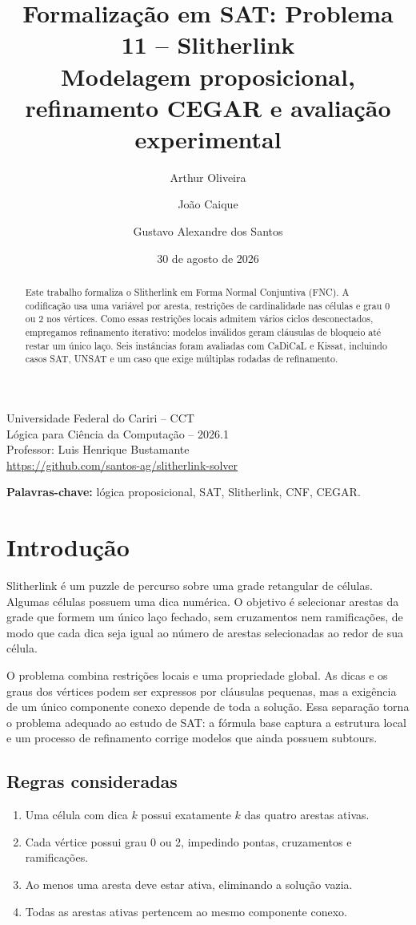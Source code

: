 \documentclass[11pt,a4paper]{article}
\title{\textbf{Formalização em SAT: Problema 11 -- Slitherlink}\\
\large Modelagem proposicional, refinamento CEGAR e avaliação experimental}
\author{Arthur Oliveira \and João Caique \and Gustavo Alexandre dos Santos}
\date{30 de agosto de 2026}
\begin{document}
\maketitle

\begin{center}
Universidade Federal do Cariri -- CCT\\
Lógica para Ciência da Computação -- 2026.1\\
Professor: Luis Henrique Bustamante\\[1em]
\url{https://github.com/santos-ag/slitherlink-solver}
\end{center}

\begin{abstract}
Este trabalho formaliza o Slitherlink em Forma Normal Conjuntiva (FNC). A codificação usa uma variável por aresta, restrições de cardinalidade nas células e grau 0 ou 2 nos vértices. Como essas restrições locais admitem vários ciclos desconectados, empregamos refinamento iterativo: modelos inválidos geram cláusulas de bloqueio até restar um único laço. Seis instâncias foram avaliadas com CaDiCaL e Kissat, incluindo casos SAT, UNSAT e um caso que exige múltiplas rodadas de refinamento.
\end{abstract}

\vfill
\begin{center}
\textbf{Palavras-chave:} lógica proposicional, SAT, Slitherlink, CNF, CEGAR.
\end{center}
\newpage

\section{Introdução}
Slitherlink é um puzzle de percurso sobre uma grade retangular de células. Algumas células possuem uma dica numérica. O objetivo é selecionar arestas da grade que formem um único laço fechado, sem cruzamentos nem ramificações, de modo que cada dica seja igual ao número de arestas selecionadas ao redor de sua célula.

O problema combina restrições locais e uma propriedade global. As dicas e os graus dos vértices podem ser expressos por cláusulas pequenas, mas a exigência de um único componente conexo depende de toda a solução. Essa separação torna o problema adequado ao estudo de SAT: a fórmula base captura a estrutura local e um processo de refinamento corrige modelos que ainda possuem subtours.

\subsection{Regras consideradas}
\begin{enumerate}
  \item Uma célula com dica $k$ possui exatamente $k$ das quatro arestas ativas.
  \item Cada vértice possui grau 0 ou 2, impedindo pontas, cruzamentos e ramificações.
  \item Ao menos uma aresta deve estar ativa, eliminando a solução vazia.
  \item Todas as arestas ativas pertencem ao mesmo componente conexo.
\end{enumerate}
\end{document}
